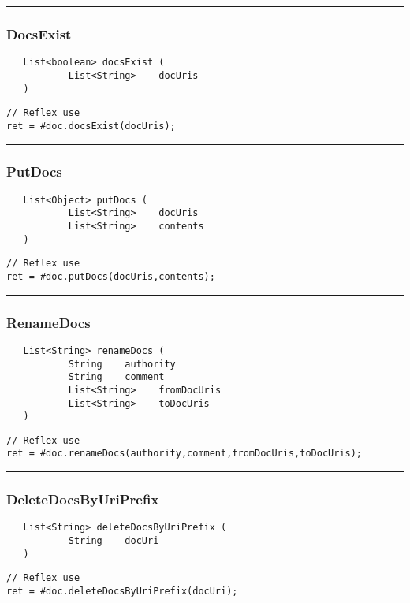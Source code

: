 \rule{15cm}{2pt}
\subsubsection{DocsExist}
\label{Api:DocsExist}
\begin{verbatim}
   List<boolean> docsExist (
           List<String>    docUris
   )
\end{verbatim}
\begin{lstlisting}[language=reflex]
// Reflex use
ret = #doc.docsExist(docUris);
\end{lstlisting}



\rule{15cm}{2pt}
\subsubsection{PutDocs}
\label{Api:PutDocs}
\begin{verbatim}
   List<Object> putDocs (
           List<String>    docUris
           List<String>    contents
   )
\end{verbatim}
\begin{lstlisting}[language=reflex]
// Reflex use
ret = #doc.putDocs(docUris,contents);
\end{lstlisting}



\rule{15cm}{2pt}
\subsubsection{RenameDocs}
\label{Api:RenameDocs}
\begin{verbatim}
   List<String> renameDocs (
           String    authority
           String    comment
           List<String>    fromDocUris
           List<String>    toDocUris
   )
\end{verbatim}
\begin{lstlisting}[language=reflex]
// Reflex use
ret = #doc.renameDocs(authority,comment,fromDocUris,toDocUris);
\end{lstlisting}



\rule{15cm}{2pt}
\subsubsection{DeleteDocsByUriPrefix}
\label{Api:DeleteDocsByUriPrefix}
\begin{verbatim}
   List<String> deleteDocsByUriPrefix (
           String    docUri
   )
\end{verbatim}
\begin{lstlisting}[language=reflex]
// Reflex use
ret = #doc.deleteDocsByUriPrefix(docUri);
\end{lstlisting}



